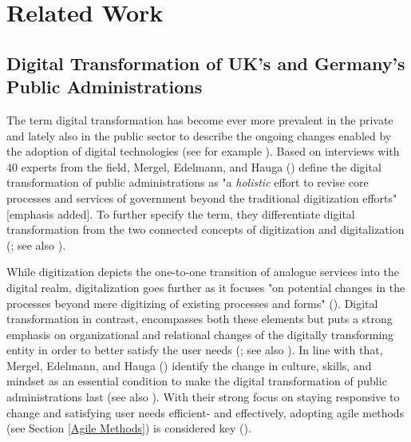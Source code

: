 \section{Related Work}
\subsection{Digital Transformation of UK's and Germany's Public Administrations}\label{Digital Transformation}
The term digital transformation has become ever more prevalent in the private and lately also in the public sector to describe the ongoing changes enabled by the adoption of digital technologies (see for example \cite{McKinsey2018,BehordenSpiegel2020,Tabrizi2019}). Based on interviews with 40 experts from the field, Mergel, Edelmann, and Hauga (\cite*[p. 12]{Mergel2019a}) define the digital transformation of public administrations as "a \textit{holistic} effort to revise core processes and services of government beyond the traditional digitization efforts" [emphasis added]. To further specify the term, they differentiate digital transformation from the two connected concepts of digitization and digitalization (\cite{Mergel2019a}; see also \cite{Bloomberg2018, Brennen2015}).\par 
While digitization depicts the one-to-one transition of analogue services into the digital realm, digitalization goes further as it focuses "on potential changes in the processes beyond mere digitizing of existing processes and forms" (\cite[p. 12]{Mergel2019a}). Digital transformation in contrast, encompasses both these elements but puts a strong emphasis on organizational and relational changes of the digitally transforming entity in order to better satisfy the user needs (\cite{Mergel2019a}; see also \cite{Vial2019, Henriette2015}). In line with that, Mergel, Edelmann, and Hauga (\cite*{Mergel2019a}) identify the change in culture, skills, and mindset as an essential condition to make the digital transformation of public administrations last (see also \cite{Dierks2020, Parcell2013}). With their strong focus on staying responsive to change and satisfying user needs efficient- and effectively, adopting agile methods (see Section \ref{Agile Methods}) is considered key (\cite{Mergel2018,Beyer2010, Mergel2019, osmundsen2020, Andriole2018}).\par 
